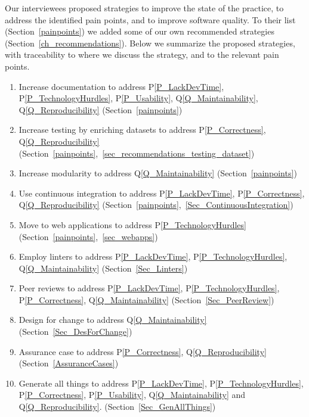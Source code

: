 \documentclass[final, 12pt, 3p, times]{elsarticle}
\newcommand{\ppref}[1]{P\ref{#1}}
\newcommand{\qref}[1]{Q\ref{#1}}
\begin{document}
Our interviewees proposed strategies to improve the state of the practice, to
address the identified pain points, and to improve software quality.  To their
list (Section~\ref{painpoints}) we added some of our own recommended strategies
(Section~\ref{ch_recommendations}).  Below we summarize the proposed strategies,
with traceability to where we discuss the strategy, and to the relevant pain
points.

\begin{enumerate}

\item Increase documentation to address \ppref{P_LackDevTime},
\ppref{P_TechnologyHurdles}, \ppref{P_Usability}, \qref{Q_Maintainability},
\qref{Q_Reproducibility} (Section~\ref{painpoints})

\item Increase testing by enriching datasets to address \ppref{P_Correctness},
\qref{Q_Reproducibility}
(Section~\ref{painpoints},~\ref{sec_recommendations_testing_dataset})

\item Increase modularity to address \qref{Q_Maintainability} (Section~\ref{painpoints})

\item Use continuous integration to address \ppref{P_LackDevTime},
\ppref{P_Correctness}, \qref{Q_Reproducibility}
(Section~\ref{painpoints},~\ref{Sec_ContinuousIntegration})

\item Move to web applications to address \ppref{P_TechnologyHurdles}
(Section~\ref{painpoints},~\ref{sec_webapps})

\item Employ linters to address \ppref{P_LackDevTime},
\ppref{P_TechnologyHurdles}, \qref{Q_Maintainability}
(Section~\ref{Sec_Linters})

\item Peer reviews to address \ppref{P_LackDevTime},
\ppref{P_TechnologyHurdles}, \ppref{P_Correctness}, \qref{Q_Maintainability}
(Section~\ref{Sec_PeerReview})

\item Design for change to address \qref{Q_Maintainability} (Section~\ref{Sec_DesForChange})

\item Assurance case to address \ppref{P_Correctness}, \qref{Q_Reproducibility}
(Section~\ref{AssuranceCases})

\item Generate all things to address \ppref{P_LackDevTime},
\ppref{P_TechnologyHurdles}, \ppref{P_Correctness}, \ppref{P_Usability},
\qref{Q_Maintainability} and \qref{Q_Reproducibility}.
(Section~\ref{Sec_GenAllThings})

\end{enumerate}
\end{document}
